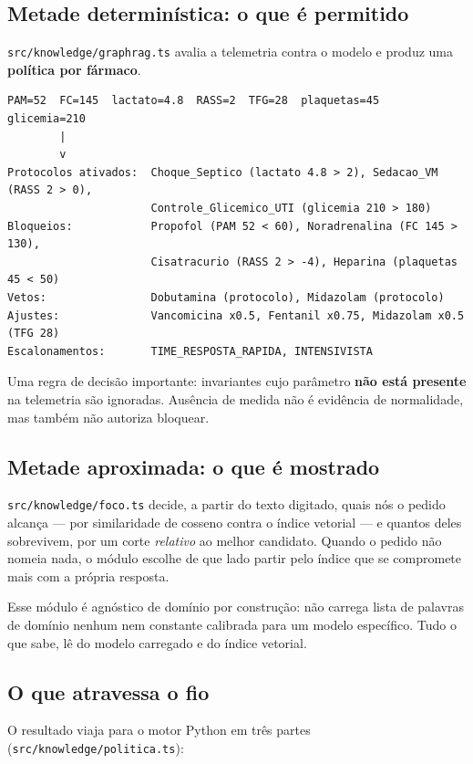 \documentclass[11pt,a4paper]{article}
\newcommand{\arq}[1]{\texttt{\small #1}}
\begin{document}
\subsection{Metade determinística: o que é permitido}

\arq{src/knowledge/graphrag.ts} avalia a telemetria contra o modelo e produz uma
\textbf{política por fármaco}.

\begin{lstlisting}
PAM=52  FC=145  lactato=4.8  RASS=2  TFG=28  plaquetas=45  glicemia=210
        |
        v
Protocolos ativados:  Choque_Septico (lactato 4.8 > 2), Sedacao_VM (RASS 2 > 0),
                      Controle_Glicemico_UTI (glicemia 210 > 180)
Bloqueios:            Propofol (PAM 52 < 60), Noradrenalina (FC 145 > 130),
                      Cisatracurio (RASS 2 > -4), Heparina (plaquetas 45 < 50)
Vetos:                Dobutamina (protocolo), Midazolam (protocolo)
Ajustes:              Vancomicina x0.5, Fentanil x0.75, Midazolam x0.5 (TFG 28)
Escalonamentos:       TIME_RESPOSTA_RAPIDA, INTENSIVISTA
\end{lstlisting}

Uma regra de decisão importante: invariantes cujo parâmetro \textbf{não está
presente} na telemetria são ignoradas. Ausência de medida não é evidência de
normalidade, mas também não autoriza bloquear.

\subsection{Metade aproximada: o que é mostrado}

\arq{src/knowledge/foco.ts} decide, a partir do texto digitado, quais nós o
pedido alcança --- por similaridade de cosseno contra o índice vetorial --- e
quantos deles sobrevivem, por um corte \emph{relativo} ao melhor candidato.
Quando o pedido não nomeia nada, o módulo escolhe de que lado partir pelo índice
que se compromete mais com a própria resposta.

Esse módulo é agnóstico de domínio por construção: não carrega lista de palavras
de domínio nenhum nem constante calibrada para um modelo específico. Tudo o que
sabe, lê do modelo carregado e do índice vetorial.

\subsection{O que atravessa o fio}

O resultado viaja para o motor Python em três partes
(\arq{src/knowledge/politica.ts}):
\end{document}
